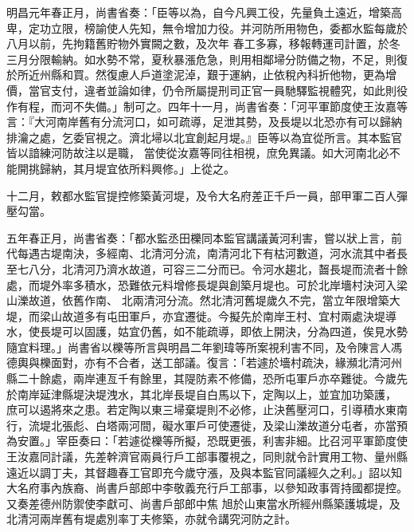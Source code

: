 \begin{pinyinscope}
 明昌元年春正月，尚書省奏：「臣等以為，自今凡興工役，先量負土遠近，增築高卑，定功立限，榜諭使人先知，無令增加力役。并河防所用物色，委都水監每歲於八月以前，先拘籍舊貯物外實闕之數，及次年
 春工多寡，移報轉運司計置，於冬三月分限輸納。如水勢不常，夏秋暴漲危急，則用相鄰埽分防備之物，不足，則復於所近州縣和買。然復慮人戶道塗泥淖，艱于運納，止依稅內科折他物，更為增價，當官支付，違者並論如律，仍令所屬提刑司正官一員馳驛監視體究，如此則役作有程，而河不失備。」制可之。四年十一月，尚書省奏：「河平軍節度使王汝嘉等言：『大河南岸舊有分流河口，如可疏導，足泄其勢，及長堤以北恐亦有可以歸納排瀹之處，乞委官視之。濟北埽以北宜創起月堤。』臣等以為宜從所言。其本監官皆以諳練河防故注以是職，
 當使從汝嘉等同往相視，庶免異議。如大河南北必不能開挑歸納，其月堤宜依所料興修。」上從之。



 十二月，敕都水監官提控修築黃河堤，及令大名府差正千戶一員，部甲軍二百人彈壓勾當。



 五年春正月，尚書省奏：「都水監丞田櫟同本監官講議黃河利害，嘗以狀上言，前代每遇古堤南決，多經南、北清河分流，南清河北下有枯河數道，河水流其中者長至七八分，北清河乃濟水故道，可容三二分而已。令河水趨北，齧長堤而流者十餘處，而堤外率多積水，恐難依元料增修長堤與創築月堤也。可於北岸墻村決河入梁山濼故道，依舊作南、
 北兩清河分流。然北清河舊堤歲久不完，當立年限增築大堤，而梁山故道多有屯田軍戶，亦宜遷徙。今擬先於南岸王村、宜村兩處決堤導水，使長堤可以固護，姑宜仍舊，如不能疏導，即依上開決，分為四道，俟見水勢隨宜料理。」尚書省以櫟等所言與明昌二年劉瑋等所案視利害不同，及令陳言人馮德輿與櫟面對，亦有不合者，送工部議。復言：「若遽於墻村疏決，緣瀕北清河州縣二十餘處，兩岸連亙千有餘里，其隄防素不修備，恐所屯軍戶亦卒難徙。今歲先於南岸延津縣堤決堤洩水，其北岸長堤自白馬以下，定陶以上，並宜加功築護，
 庶可以遏將來之患。若定陶以東三埽棄堤則不必修，止決舊壓河口，引導積水東南行，流堤北張彪、白塔兩河間，礙水軍戶可使遷徙，及梁山濼故道分屯者，亦當預為安置。」宰臣奏曰：「若遽從櫟等所擬，恐既更張，利害非細。比召河平軍節度使王汝嘉同計議，先差幹濟官兩員行戶工部事覆視之，同則就令計實用工物、量州縣遠近以調丁夫，其督趣春工官即充今歲守漲，及與本監官同議經久之利。」詔以知大名府事內族裔、尚書戶部郎中李敬義充行戶工部事，以參知政事胥持國都提控。又奏差德州防禦使李獻可、尚書戶部郎中焦
 旭於山東當水所經州縣築護城堤，及北清河兩岸舊有堤處別率丁夫修築，亦就令講究河防之計。




\end{pinyinscope}
